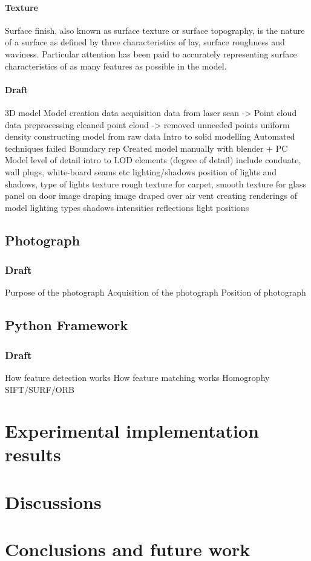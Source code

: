 \documentclass[11pt,a4paper]{report}
\begin{document}
				\subsubsection{Texture}
				
				Surface finish, also known as surface texture or surface topography, is the nature of a surface as defined by three characteristics of lay, surface roughness and waviness.
				\cite{e._paul_degarmo_materials_2003}
				Particular attention has been paid to accurately representing surface characteristics of as many features as possible in the model. 
			
			\subsubsection{Draft}
				3D model
					Model creation
						data acquisition
							data from laser scan -> Point cloud
						data preprocessing
							cleaned point cloud -> removed unneeded points
							uniform density
						constructing model from raw data
							Intro to solid modelling
							Automated techniques failed
							Boundary rep
							Created model manually with blender + PC
					Model level of detail
						intro to LOD
						elements (degree of detail)
							include conduate, wall plugs, white-board seams etc
						lighting/shadows
							position of lights and shadows, type of lights
						texture
							rough texture for carpet, smooth texture for glass panel on door
						image draping
							image draped over air vent
					creating renderings of model
						lighting types
						shadows
						intensities
						reflections
						light positions
		\section{Photograph}
			\subsection{Draft}
				Purpose of the photograph
				Acquisition of the photograph
				Position of photograph
				
			
		\section{Python Framework}
			\subsection{Draft}
				How feature detection works
				How feature matching works
				Homogrophy
				SIFT/SURF/ORB
					

\chapter{Experimental implementation results}

\chapter{Discussions}

\chapter{Conclusions and future work}

\newpage
\printbibliography
\end{document}
